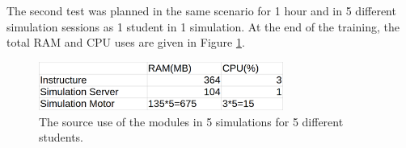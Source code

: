 \documentclass[conference]{IEEEtran}
\begin{document}
The second test was planned in the same scenario for 1 hour and in 5 different simulation sessions as 1 student in 1 simulation. At the end of the training, the total RAM and CPU uses are given in Figure \ref{fig:hepsiayri}.

\begin{figure}[h!]
  \centering
  \includegraphics[width=8cm]{hepsiayri.png}
  \caption{The source use of the modules in 5 simulations for 5 different students.}\label{fig:hepsiayri}
  
\end{figure}
\end{document}
